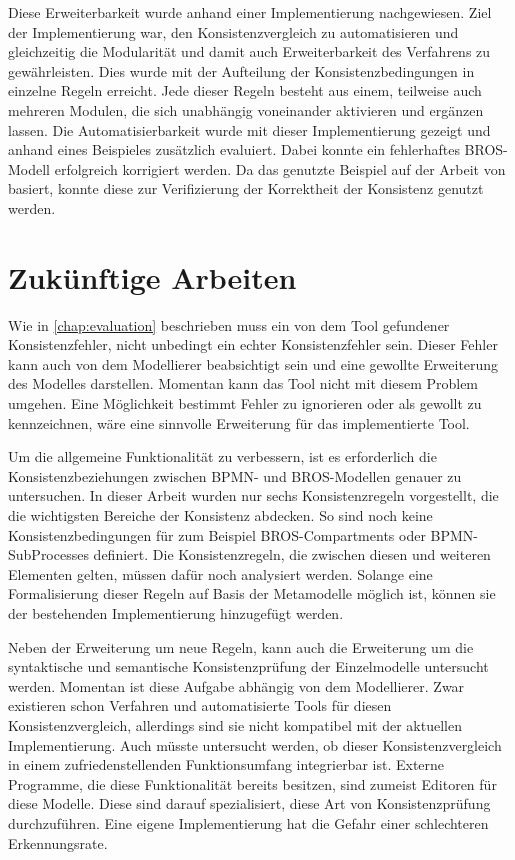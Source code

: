 Diese Erweiterbarkeit wurde anhand einer Implementierung nachgewiesen.
Ziel der Implementierung war, den Konsistenzvergleich zu automatisieren und gleichzeitig die Modularität und damit auch Erweiterbarkeit des Verfahrens zu gewährleisten.
Dies wurde mit der Aufteilung der Konsistenzbedingungen in einzelne Regeln erreicht.
Jede dieser Regeln besteht aus einem, teilweise auch mehreren Modulen, die sich unabhängig voneinander aktivieren und ergänzen lassen.
Die Automatisierbarkeit wurde mit dieser Implementierung gezeigt und anhand eines Beispieles zusätzlich evaluiert.
Dabei konnte ein fehlerhaftes BROS-Modell erfolgreich korrigiert werden.
Da das genutzte Beispiel auf der Arbeit von \cite{Schoen} basiert, konnte diese zur Verifizierung der Korrektheit der Konsistenz genutzt werden.

\section{Zukünftige Arbeiten}

Wie in \cref{chap:evaluation} beschrieben muss ein von dem Tool gefundener Konsistenzfehler, nicht unbedingt ein echter Konsistenzfehler sein.
Dieser Fehler kann auch von dem Modellierer beabsichtigt sein und eine gewollte Erweiterung des Modelles darstellen.
Momentan kann das Tool nicht mit diesem Problem umgehen.
Eine Möglichkeit bestimmt Fehler zu ignorieren oder als gewollt zu kennzeichnen, wäre eine sinnvolle Erweiterung für das implementierte Tool.

Um die allgemeine Funktionalität zu verbessern, ist es erforderlich die Konsistenzbeziehungen zwischen BPMN- und BROS-Modellen genauer zu untersuchen.
In dieser Arbeit wurden nur sechs Konsistenzregeln vorgestellt, die die wichtigsten Bereiche der Konsistenz abdecken.
So sind noch keine Konsistenzbedingungen für zum Beispiel BROS-Compartments oder BPMN-SubProcesses definiert.
Die Konsistenzregeln, die zwischen diesen und weiteren Elementen gelten, müssen dafür noch analysiert werden.
Solange eine Formalisierung dieser Regeln auf Basis der Metamodelle möglich ist, können sie der bestehenden Implementierung hinzugefügt werden.

Neben der Erweiterung um neue Regeln, kann auch die Erweiterung um die syntaktische und semantische Konsistenzprüfung der Einzelmodelle untersucht werden.
Momentan ist diese Aufgabe abhängig von dem Modellierer.
Zwar existieren schon Verfahren und automatisierte Tools für diesen Konsistenzvergleich, allerdings sind sie nicht kompatibel mit der aktuellen Implementierung.
Auch müsste untersucht werden, ob dieser Konsistenzvergleich in einem zufriedenstellenden Funktionsumfang integrierbar ist.
Externe Programme, die diese Funktionalität bereits besitzen, sind zumeist Editoren für diese Modelle.
Diese sind darauf spezialisiert, diese Art von Konsistenzprüfung durchzuführen.
Eine eigene Implementierung hat die Gefahr einer schlechteren Erkennungsrate.

